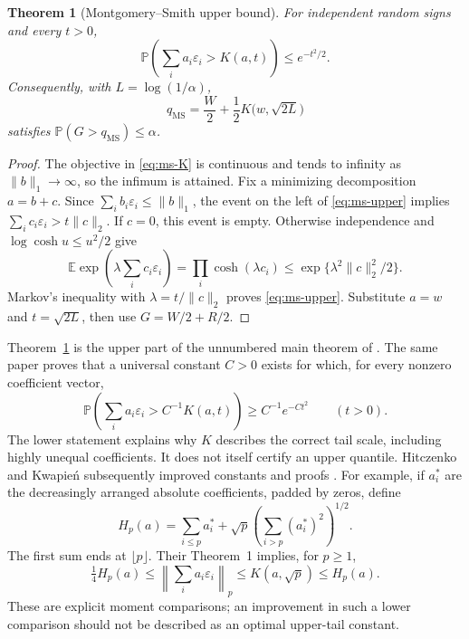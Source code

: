 \documentclass[11pt,letterpaper]{article}
\numberwithin{equation}{section}
\newtheorem{theorem}{Theorem}[section]
\theoremstyle{definition}
\theoremstyle{remark}
\begin{document}
\par\noindent\begin{minipage}{\linewidth}
\begin{theorem}[Montgomery--Smith upper bound]
\label{thm:ms-upper}
For independent random signs and every $t>0$,
\begin{equation}
 \mathbb P\left(\sum_i a_i\varepsilon_i>K(a,t)\right)
       \le e^{-t^2/2}.
 \label{eq:ms-upper}
\end{equation}
Consequently, with $L=\log(1/\alpha)$,
\begin{equation}
 q_{\mathrm{MS}}=\frac W2+\frac12K\bigl(w,\sqrt{2L}\bigr)
 \label{eq:ms-quantile}
\end{equation}
satisfies $\mathbb P(G>q_{\mathrm{MS}})\le\alpha$.
\end{theorem}
\end{minipage}\par
\begin{proof}
The objective in \eqref{eq:ms-K} is continuous and tends to infinity as
$\|b\|_1\to\infty$, so the infimum is attained. Fix a minimizing
decomposition $a=b+c$. Since $\sum_i b_i\varepsilon_i\le\|b\|_1$, the
event on the left of \eqref{eq:ms-upper} implies
$\sum_i c_i\varepsilon_i>t\|c\|_2$. If $c=0$, this event is empty.
Otherwise independence and $\log\cosh u\le u^2/2$ give
\[
 \mathbb E\exp\left(\lambda\sum_i c_i\varepsilon_i\right)
 =\prod_i\cosh(\lambda c_i)
 \le\exp\{\lambda^2\|c\|_2^2/2\}.
\]
Markov's inequality with $\lambda=t/\|c\|_2$ proves
\eqref{eq:ms-upper}. Substitute $a=w$ and $t=\sqrt{2L}$, then use
$G=W/2+R/2$.
\end{proof}

Theorem~\ref{thm:ms-upper} is the upper part of the unnumbered main theorem
of \cite{montgomerysmith1990}. The same paper proves that a universal
constant $C>0$ exists for which, for every nonzero coefficient vector,
\[
 \mathbb P\left(\sum_i a_i\varepsilon_i>C^{-1}K(a,t)\right)
 \ge C^{-1}e^{-Ct^2}\qquad(t>0).
\]
The lower statement explains why $K$ describes the correct tail scale,
including highly unequal coefficients. It does not itself certify an upper
quantile. Hitczenko and Kwapie\'n subsequently improved constants and proofs
\cite{hitczenkokwapien1994}. For example, if $a_i^*$ are the decreasingly
arranged absolute coefficients, padded by zeros, define
\[
 H_p(a)=\sum_{i\le p}a_i^*
     +\sqrt p\left(\sum_{i>p}(a_i^*)^2\right)^{1/2}.
\]
The first sum ends at $\lfloor p\rfloor$. Their Theorem~1 implies, for $p\ge1$,
\begin{equation}
 \tfrac14 H_p(a)\le\left\|\sum_i a_i\varepsilon_i\right\|_p
 \le K(a,\sqrt p)\le H_p(a).
 \label{eq:hk-moment-comparison}
\end{equation}
These are explicit
moment comparisons; an improvement in such a lower comparison should not
be described as an optimal upper-tail constant.
\end{document}
